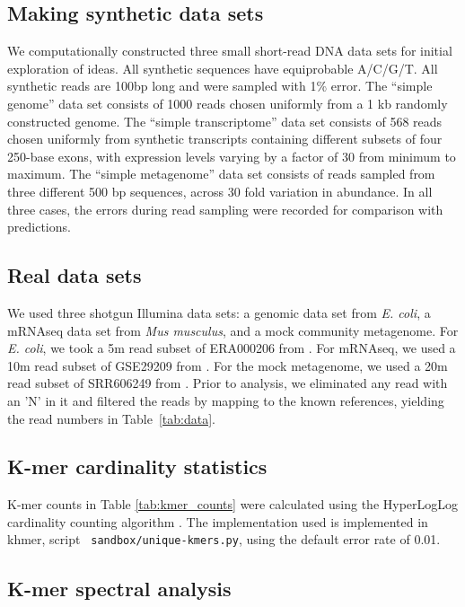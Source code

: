 \documentclass{article}
\begin{document}
\subsection{Making synthetic data sets}

We computationally constructed three small short-read DNA data sets
for initial exploration of ideas.  All synthetic sequences have
equiprobable A/C/G/T.  All synthetic reads are 100bp long and were
sampled with 1\% error.  The ``simple genome'' data set consists of
1000 reads chosen uniformly from a 1 kb randomly constructed genome.
The ``simple transcriptome'' data set consists of 568 reads chosen
uniformly from synthetic transcripts containing different subsets of
four 250-base exons, with expression levels varying by a factor of 30
from minimum to maximum.  The ``simple metagenome'' data set consists
of reads sampled from three different 500 bp sequences, across 30 fold
variation in abundance.  In all three cases, the errors during read
sampling were recorded for comparison with predictions.

\subsection{Real data sets}

We used three shotgun Illumina data sets: a genomic data set from {\em
  E. coli}, a mRNAseq data set from {\em Mus musculus}, and a mock
community metagenome.  For {\em E. coli}, we took a 5m read subset of
ERA000206 from \cite{chitsaz}.  For mRNAseq, we used a 10m read subset
of GSE29209 from \cite{trinityrna}.  For the mock metagenome, we used
a 20m read subset of SRR606249 from \cite{podar}.  Prior to analysis,
we eliminated any read with an 'N' in it and filtered the reads by
mapping to the known references, yielding the read numbers in
Table~\ref{tab:data}.

\subsection{K-mer cardinality statistics}

K-mer counts in Table \ref{tab:kmer_counts} were calculated using the
HyperLogLog cardinality counting algorithm \cite{hll}.  The
implementation used is implemented in khmer, script {\tt
  sandbox/unique-kmers.py}, using the default error rate of 0.01.

\subsection{K-mer spectral analysis}
\end{document}

